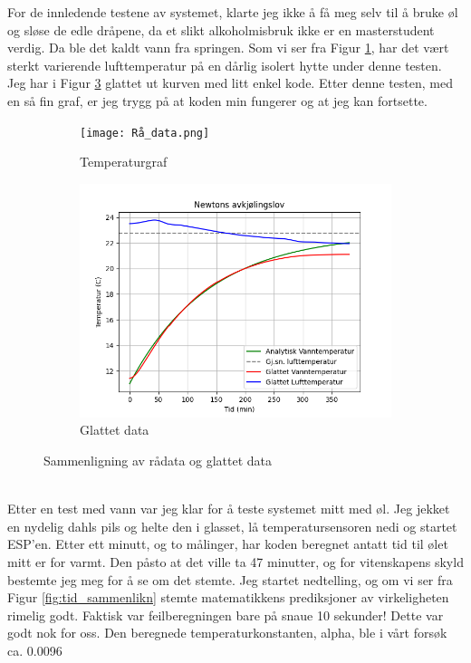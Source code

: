 \documentclass{article}
\begin{document}
For de innledende testene av systemet, klarte jeg ikke å få meg selv til å bruke øl og sløse de edle dråpene, da et slikt alkoholmisbruk ikke er en masterstudent verdig. Da ble det kaldt vann fra springen.
Som vi ser fra Figur \ref{fig:temperaturgraf}, har det vært sterkt varierende lufttemperatur på en dårlig isolert hytte under denne testen. Jeg har i Figur \ref{fig:glattet} glattet ut kurven med litt enkel kode. Etter denne testen, med en så fin graf, er jeg trygg på at koden min fungerer og at jeg kan fortsette.
\begin{figure}[h!]
    \centering
    \begin{subfigure}[b]{0.45\textwidth}
        \centering
        \texttt{[image: Rå\_data.png]}
        \caption{Temperaturgraf}
        \label{fig:temperaturgraf}
    \end{subfigure}
    \hfill
    \begin{subfigure}[b]{0.45\textwidth}
        \centering
        \includegraphics[width=\textwidth]{Glattet_data.png}
        \caption{Glattet data}
        \label{fig:glattet}
    \end{subfigure}
    \caption{Sammenligning av rådata og glattet data}
\end{figure}\\
Etter en test med vann var jeg klar for å teste systemet mitt med øl. Jeg jekket en nydelig dahls pils og helte den i glasset, lå temperatursensoren nedi og startet ESP'en. Etter ett minutt, og to målinger, har koden beregnet antatt tid til ølet mitt er for varmt. Den påsto at det ville ta 47 minutter, og for vitenskapens skyld bestemte jeg meg for å se om det stemte. Jeg startet nedtelling, og om vi ser fra Figur \ref{fig:tid_sammenlikn} stemte matematikkens prediksjoner av virkeligheten rimelig godt. Faktisk var feilberegningen bare på snaue 10 sekunder! Dette var godt nok for oss. Den beregnede temperaturkonstanten, alpha, ble i vårt forsøk ca. 0.0096
\end{document}
